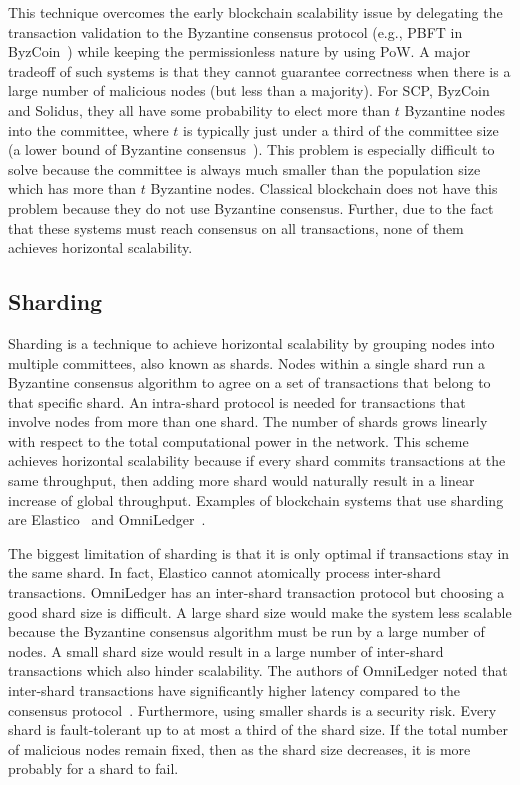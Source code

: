 This technique overcomes the early blockchain scalability issue by delegating the transaction validation to the Byzantine consensus protocol (e.g., PBFT in ByzCoin~\cite{kogias2016enhancing})
while keeping the permissionless nature by using PoW.
A major tradeoff of such systems is that they cannot guarantee correctness when there is a large number of malicious nodes (but less than a majority).
For SCP, ByzCoin and Solidus, they all have some probability to elect more than $t$ Byzantine nodes into the committee,
where $t$ is typically just under a third of the committee size (a lower bound of Byzantine consensus~\cite{pease1980reaching}).
This problem is especially difficult to solve because the committee is always much smaller than the population size which has more than $t$ Byzantine nodes.
Classical blockchain does not have this problem because they do not use Byzantine consensus.
Further, due to the fact that these systems must reach consensus on all transactions, none of them achieves horizontal scalability.

\subsection{Sharding}
\label{sec:sharding}

Sharding is a technique to achieve horizontal scalability by grouping nodes into multiple committees, also known as shards.
Nodes within a single shard run a Byzantine consensus algorithm to agree on a set of transactions that belong to that specific shard.
An intra-shard protocol is needed for transactions that involve nodes from more than one shard.
The number of shards grows linearly with respect to the total computational power in the network.
This scheme achieves horizontal scalability because if every shard commits transactions at the same throughput,
then adding more shard would naturally result in a linear increase of global throughput.
Examples of blockchain systems that use sharding are Elastico~\cite{luu2016elastico} and Omni\-Ledger~\cite{kokoris2017omniledger}.

The biggest limitation of sharding is that it is only optimal if transactions stay in the same shard.
In fact, Elastico cannot atomically process inter-shard transactions.
OmniLedger has an inter-shard transaction protocol but choosing a good shard size is difficult.
A large shard size would make the system less scalable because the Byzantine consensus algorithm must be run by a large number of nodes.
A small shard size would result in a large number of inter-shard transactions which also hinder scalability.
The authors of OmniLedger noted that inter-shard transactions have significantly higher latency compared to the consensus protocol~\cite{kokoris2017omniledger}.
Furthermore, using smaller shards is a security risk.
Every shard is fault-tolerant up to at most a third of the shard size.
If the total number of malicious nodes remain fixed, then as the shard size decreases,
it is more probably for a shard to fail.

